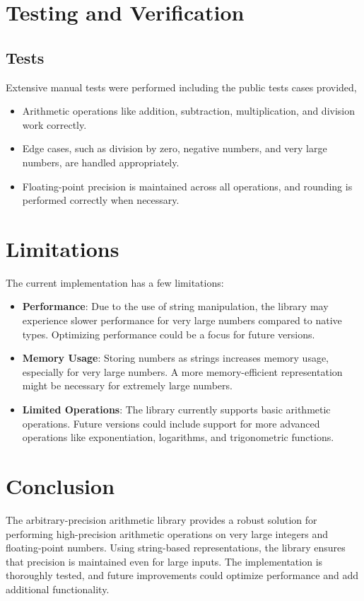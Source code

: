 \documentclass[12pt]{article}
\begin{document}
\section{Testing and Verification}

\subsection{Tests}
Extensive manual tests were performed including the public tests cases provided,
\begin{itemize}
    \item Arithmetic operations like addition, subtraction, multiplication, and division work correctly.
    \item Edge cases, such as division by zero, negative numbers, and very large numbers, are handled appropriately.
    \item Floating-point precision is maintained across all operations, and rounding is performed correctly when necessary.
\end{itemize}

\section{Limitations}

The current implementation has a few limitations:
\begin{itemize}
    \item \textbf{Performance}: Due to the use of string manipulation, the library may experience slower performance for very large numbers compared to native types. Optimizing performance could be a focus for future versions.
    \item \textbf{Memory Usage}: Storing numbers as strings increases memory usage, especially for very large numbers. A more memory-efficient representation might be necessary for extremely large numbers.
    \item \textbf{Limited Operations}: The library currently supports basic arithmetic operations. Future versions could include support for more advanced operations like exponentiation, logarithms, and trigonometric functions.
\end{itemize}


\section{Conclusion}
The arbitrary-precision arithmetic library provides a robust solution for performing high-precision arithmetic operations on very large integers and floating-point numbers. Using string-based representations, the library ensures that precision is maintained even for large inputs. The implementation is thoroughly tested, and future improvements could optimize performance and add additional functionality.
\end{document}

